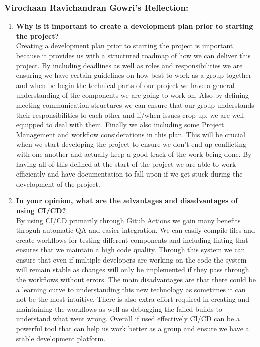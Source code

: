 \documentclass{article}
\begin{document}
\subsubsection*{Virochaan Ravichandran Gowri's Reflection: }
\begin{enumerate}
    \item \textbf{Why is it important to create a development plan prior to starting the
    project?} \\ 
    Creating a development plan prior to starting the project is important because it provides us with a structured roadmap of how we can deliver this project. By including deadlines as well as roles and responsibilities we are ensuring we have certain guidelines on how best to work as a group together and when be begin the technical parts of our project we have a general understanding of the components we are going to work on. Also by defining meeting communication structures we can ensure that our group understands their responsibilities to each other and if/when issues crop up, we are well equipped to deal with them. Finally we also including some Project Management and workflow considerations in this plan. This will be crucial when we start developing the project to ensure we don't end up conflicting with one another and actually keep a good track of the work being done. By having all of this defined at the start of the project we are able to work efficiently and have documentation to fall upon if we get stuck during the development of the project.
    \item \textbf{In your opinion, what are the advantages and disadvantages of using CI/CD?} \\
    By using CI/CD primarily through Gitub Actions we gain many benefits throguh automatic QA and easier integration. We can easily compile files and create workflows for testing different components and including linting that ensures that we maintain a high code quality. Through this system we can ensure that even if multiple developers are working on the code the system will remain stable as changes will only be implemented if they pass through the workflows without errors. The main disadvantages are that there could be a learning curve to understanding this new technology as sometimes it can not be the most intuitive. There is also extra effort required in creating and maintaining the workflows as well as debugging the failed builds to understand what went wrong. Overall if used effectively CI/CD can be a powerful tool that can help us work better as a group and ensure we have a stable development platform.
\end{enumerate}
\end{document}

